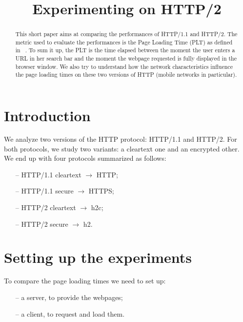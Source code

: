 \documentclass[12pt, notitlepage]{article}
\begin{document}


\title{Experimenting on HTTP/2}
\maketitle

\begin{abstract}
This short paper aims at comparing the performances of HTTP/1.1 and HTTP/2.
The metric used to evaluate the performances is the Page Loading Time
(PLT) as defined in ~\cite{w3c}.
To sum it up, the PLT is the time elapsed between the moment the user
enters a URL in her search bar and the moment the webpage requested is
fully displayed in the browser window. We also try to understand how the
network characteristics influence the page loading times on these two
versions of HTTP (mobile networks in particular).
\end{abstract}

\section{Introduction}

We analyze two versions of the HTTP protocol: HTTP/1.1 and HTTP/2.
For both protocols, we study two variants: a cleartext one and an
encrypted other. We end up with four protocols summarized as follows:
\begin{itemize}[noitemsep]
	\item[--] HTTP/1.1 cleartext $\to$ HTTP;
	\item[--] HTTP/1.1 secure $\to$ HTTPS;
	\item[--] HTTP/2 cleartext $\to$ h2c;
	\item[--] HTTP/2 secure $\to$ h2.
\end{itemize}
\newpage
\section{Setting up the experiments}

To compare the page loading times we need to set up: 
\begin{itemize}[noitemsep]
\item[--] a server, to provide the webpages;
\item[--] a client, to request and load them.
\end{itemize}
\end{document}
